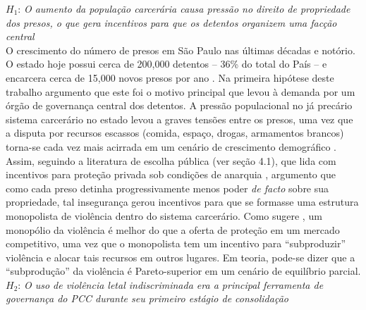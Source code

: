 \documentclass[a4paper,11pt]{article}
\begin{document}
$H_1$: \textit{O aumento da população carcerária causa pressão no direito de propriedade dos presos, o que gera incentivos para que os detentos organizem uma facção central}\\

O crescimento do número de presos em São Paulo nas últimas décadas e notório. O estado hoje possui cerca de 200,000 detentos -- 36\% do total do País -- e encarcera cerca de 15,000 novos presos por ano \citep{ig2014numeropresos}. Na primeira hipótese deste trabalho argumento que este foi o motivo principal que levou à demanda por um órgão de governança central dos detentos. A pressão populacional no já precário sistema carcerário no estado levou a graves tensões entre os presos, uma vez que a disputa por recursos escassos (comida, espaço, drogas, armamentos brancos) torna-se cada vez mais acirrada em um cenário de crescimento demográfico \citep[275]{darke2013inmate}. Assim, seguindo a literatura de escolha pública (ver seção 4.1), que lida com incentivos para proteção privada sob condições de anarquia \citep{buchanan1975limits, nozick1974anarchy, olson1965logic}, argumento que como cada preso detinha progressivamente menos poder \textit{de facto} sobre sua propriedade, tal insegurança gerou incentivos para que se formasse uma estrutura monopolista de violência dentro do sistema carcerário. Como sugere \citet{buchanan1973defense}, um monopólio da violência é melhor do que a oferta de proteção em um mercado competitivo, uma vez que o monopolista tem um incentivo para ``subproduzir'' violência e alocar tais recursos em outros lugares. Em teoria, pode-se dizer que a ``subprodução'' da violência é Pareto-superior em um cenário de equilíbrio parcial.\\

$H_2$: \textit{O uso de violência letal indiscriminada era a principal ferramenta de governança do PCC durante seu primeiro estágio de consolidação}\\
\end{document}
